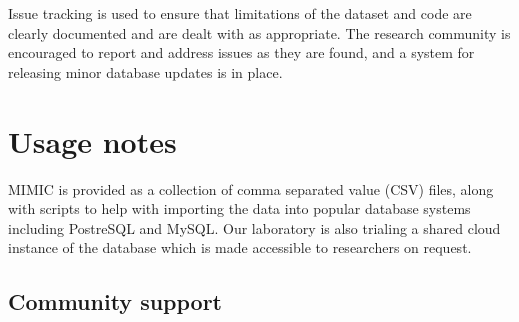 \documentclass[english]{article}
\begin{document}
Issue tracking is used to ensure that limitations of the dataset and code are clearly documented and are dealt with as appropriate. The research community is encouraged to report and address issues as they are found, and a system for releasing minor database updates is in place.


\section*{Usage notes}



MIMIC is provided as a collection of comma separated value (CSV) files, along with scripts to help with importing the data into popular database systems including PostreSQL and MySQL. Our laboratory is also trialing a shared cloud instance of the database which is made accessible to researchers on request. 

\subsection*{Community support}
\end{document}
